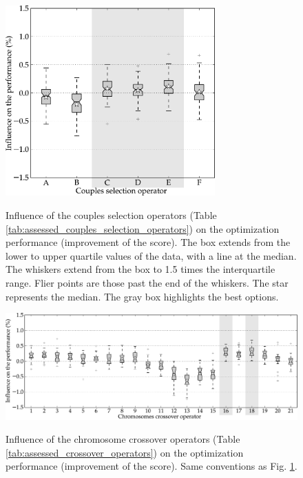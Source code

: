 \documentclass{ametsoc}
\begin{document}
\begin{figure}[t]
	\begin{center}
		\noindent\includegraphics[width=19pc,angle=0]{fig04.pdf}\\
	\end{center}
	\caption{Influence of the couples selection operators (Table \ref{tab:assessed_couples_selection_operators}) on the optimization performance (improvement of the score). The box extends from the lower to upper quartile values of the data, with a line at the median. The whiskers extend from the box to 1.5 times the interquartile range. Flier points are those past the end of the whiskers. The star represents the median. The gray box highlights the best options.}
	\label{fig:operator_selectcoupl_score}
\end{figure}

\begin{figure}[t]
	\begin{center}
		\noindent\includegraphics[width=39pc,angle=0]{fig05.pdf}\\
	\end{center}
	\caption{Influence of the chromosome crossover operators (Table \ref{tab:assessed_crossover_operators}) on the optimization performance (improvement of the score). Same conventions as Fig. \ref{fig:operator_selectcoupl_score}.}
	\label{fig:operator_crossover_score}
\end{figure}
\end{document}

